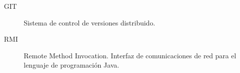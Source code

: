 \begin{description}
\item [GIT] Sistema de control de versiones distribuido.
\item [RMI] Remote Method Invocation. Interfaz de comunicaciones de red para el
lenguaje de programación Java.
\end{description}

